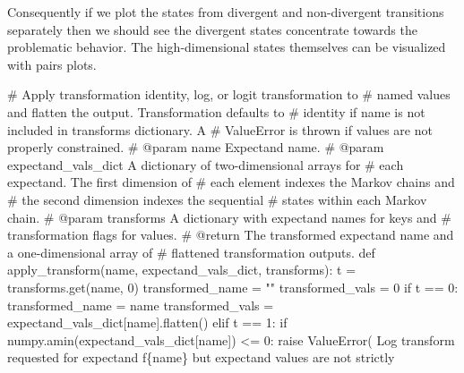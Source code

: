 \documentclass[
  letterpaper,
  DIV=11,
  numbers=noendperiod]{scrartcl}
\newenvironment{Shaded}{\begin{snugshade}}{\end{snugshade}}
\newcommand{\CommentTok}[1]{\textcolor[rgb]{0.37,0.37,0.37}{#1}}
\newcommand{\ControlFlowTok}[1]{\textcolor[rgb]{0.00,0.23,0.31}{#1}}
\newcommand{\DecValTok}[1]{\textcolor[rgb]{0.68,0.00,0.00}{#1}}
\newcommand{\KeywordTok}[1]{\textcolor[rgb]{0.00,0.23,0.31}{#1}}
\newcommand{\NormalTok}[1]{\textcolor[rgb]{0.00,0.23,0.31}{#1}}
\newcommand{\OperatorTok}[1]{\textcolor[rgb]{0.37,0.37,0.37}{#1}}
\newcommand{\PreprocessorTok}[1]{\textcolor[rgb]{0.68,0.00,0.00}{#1}}
\newcommand{\SpecialCharTok}[1]{\textcolor[rgb]{0.37,0.37,0.37}{#1}}
\newcommand{\SpecialStringTok}[1]{\textcolor[rgb]{0.13,0.47,0.30}{#1}}
\newcommand{\StringTok}[1]{\textcolor[rgb]{0.13,0.47,0.30}{#1}}
\begin{document}
Consequently if we plot the states from divergent and non-divergent
transitions separately then we should see the divergent states
concentrate towards the problematic behavior. The high-dimensional
states themselves can be visualized with pairs plots.

\begin{Shaded}
\begin{Highlighting}[]
\CommentTok{\# Apply transformation identity, log, or logit transformation to}
\CommentTok{\# named values and flatten the output.  Transformation defaults to}
\CommentTok{\# identity if name is not included in \textasciigrave{}transforms\textasciigrave{} dictionary.  A}
\CommentTok{\# ValueError is thrown if values are not properly constrained.}
\CommentTok{\# @param name Expectand name.}
\CommentTok{\# @param expectand\_vals\_dict A dictionary of two{-}dimensional arrays for}
\CommentTok{\#                            each expectand.  The first dimension of}
\CommentTok{\#                            each element indexes the Markov chains and}
\CommentTok{\#                            the second dimension indexes the sequential}
\CommentTok{\#                            states within each Markov chain.}
\CommentTok{\# @param transforms A dictionary with expectand names for keys and}
\CommentTok{\#                   transformation flags for values.}
\CommentTok{\# @return The transformed expectand name and a one{-}dimensional array of}
\CommentTok{\#         flattened transformation outputs.}
\KeywordTok{def}\NormalTok{ apply\_transform(name, expectand\_vals\_dict, transforms):}
\NormalTok{  t }\OperatorTok{=}\NormalTok{ transforms.get(name, }\DecValTok{0}\NormalTok{)}
\NormalTok{  transformed\_name }\OperatorTok{=} \StringTok{""}
\NormalTok{  transformed\_vals }\OperatorTok{=} \DecValTok{0}
  \ControlFlowTok{if}\NormalTok{ t }\OperatorTok{==} \DecValTok{0}\NormalTok{:}
\NormalTok{    transformed\_name }\OperatorTok{=}\NormalTok{ name}
\NormalTok{    transformed\_vals }\OperatorTok{=}\NormalTok{ expectand\_vals\_dict[name].flatten()}
  \ControlFlowTok{elif}\NormalTok{ t }\OperatorTok{==} \DecValTok{1}\NormalTok{:}
    \ControlFlowTok{if}\NormalTok{ numpy.amin(expectand\_vals\_dict[name]) }\OperatorTok{\textless{}=} \DecValTok{0}\NormalTok{:}
      \ControlFlowTok{raise} \PreprocessorTok{ValueError}\NormalTok{( }\StringTok{\textquotesingle{}Log transform requested for expectand \textquotesingle{}}
                       \SpecialStringTok{f\textquotesingle{}}\SpecialCharTok{\{}\NormalTok{name}\SpecialCharTok{\}}\SpecialStringTok{ but expectand values are not strictly \textquotesingle{}} 

\end{Highlighting}
\end{Shaded}
\end{document}
